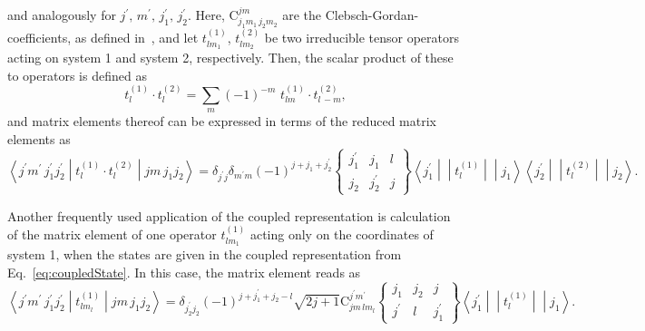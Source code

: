 and analogously for $j^\prime,\, m^\prime,\,j_1^\prime,\,j_2^\prime$. Here, $\text{C}^{jm}_{j_1m_1\,j_2m_2}$ are the Clebsch-Gordan-coefficients, as defined in~\cite[Section 9.]{varshalovich1988}, and let $t^{(1)}_{l m_1}$, $t^{(2)}_{l m_2}$ be two irreducible tensor operators acting on system 1 and system 2, respectively. Then, the scalar product of these to operators is defined as
\begin{equation}
\label{app:tensor_scalarProd}
t^{(1)}_{l}\cdot t^{(2)}_{l} = \sum_{m}(-1)^{-m}\,\, t^{(1)}_{lm}\cdot t^{(2)}_{l\,-m},
\end{equation}
and matrix elements thereof can be expressed in terms of the reduced matrix elements as~\cite{varshalovich1988}
\begin{equation}
\label{app:reducedMatEl_expectation}
\left< j^\prime m ^\prime\,j_1^\prime j_2^\prime \middle| t^{(1)}_{l}\cdot t^{(2)}_{l} \middle| j m \,j_1 j_2\right>
=
\delta_{j^\prime j}\delta_{m^\prime m}(-1)^{j+j_1+j_2^\prime}
\begin{Bmatrix}
j_1^\prime&j_1&l\\
j_2&j_2^\prime&j
\end{Bmatrix}
\left< j_1^\prime\middle|\middle| t^{(1)}_{l}\middle|\middle|j_1\right>
\left< j_2^\prime\middle|\middle| t^{(2)}_{l}\middle|\middle|j_2\right>.
\end{equation}

\newpage
Another frequently used application of the coupled representation is calculation of the matrix element of one operator $t^{(1)}_{l m_1}$ acting only on the coordinates of system 1, when the states are given in the coupled representation from Eq.~\eqref{eq:coupledState}. In this case, the matrix element reads as~\cite{varshalovich1988}
\begin{equation}
\label{app:subsystem_expectation}
\left< j^\prime m ^\prime\,j_1^\prime j_2^\prime \middle| t^{(1)}_{lm_l} \middle| j m \,j_1 j_2\right>
=
\delta_{j_2^\prime j_2}(-1)^{j+j_1^\prime+j_2-l}
\sqrt{2j+1}
\text{C}^{j^\prime m^\prime}_{j m\,lm_l}
\begin{Bmatrix}
j_1&j_2&j\\
j^\prime&l&j_1^\prime
\end{Bmatrix}
\left< j_1^\prime\middle|\middle| t^{(1)}_{l}\middle|\middle|j_1\right>.
\end{equation}
